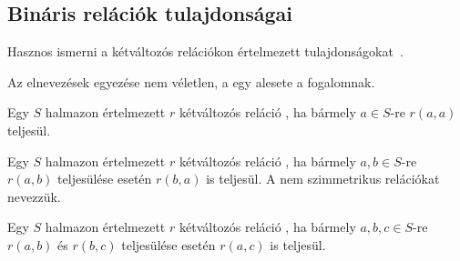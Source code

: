 \subsection{Bináris relációk tulajdonságai}

Hasznos ismerni a kétváltozós relációkon értelmezett tulajdonságokat~\cite{wiki:relacio}.

\begin{tipp}
	Az elnevezések egyezése nem véletlen, a  egy alesete a  fogalomnak.
\end{tipp}


\begin{definicio}
	Egy $S$ halmazon értelmezett $r$ kétváltozós reláció , ha bármely $a \in S$-re $r(a, a)$ teljesül.
\end{definicio}

\begin{definicio}
	Egy $S$ halmazon értelmezett $r$ kétváltozós reláció , ha bármely $a,b \in S$-re $r(a, b)$ teljesülése esetén $r(b, a)$ is teljesül. A nem szimmetrikus relációkat  nevezzük.
\end{definicio}

\begin{definicio}
	Egy $S$ halmazon értelmezett $r$ kétváltozós reláció , ha bármely $a,b,c \in S$-re $r(a, b)$ és $r(b, c)$ teljesülése esetén $r(a, c)$ is teljesül.
\end{definicio}

